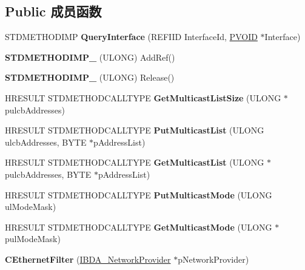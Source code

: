 \subsection*{Public 成员函数}
\begin{DoxyCompactItemize}
\item 
\mbox{\label{class_c_ethernet_filter_a9aea8339c0d38317b2fa042f58a1b2cf}} 
S\+T\+D\+M\+E\+T\+H\+O\+D\+I\+MP {\bfseries Query\+Interface} (R\+E\+F\+I\+ID Interface\+Id, \hyperlink{interfacevoid}{P\+V\+O\+ID} $\ast$Interface)
\item 
\mbox{\label{class_c_ethernet_filter_a1627f4baf9514c0c122121f06f7621fe}} 
{\bfseries S\+T\+D\+M\+E\+T\+H\+O\+D\+I\+M\+P\+\_\+} (U\+L\+O\+NG) Add\+Ref()
\item 
\mbox{\label{class_c_ethernet_filter_a08f380543c945bc69600a9c8527d1b53}} 
{\bfseries S\+T\+D\+M\+E\+T\+H\+O\+D\+I\+M\+P\+\_\+} (U\+L\+O\+NG) Release()
\item 
\mbox{\label{class_c_ethernet_filter_aa1b93ecc129da64aefc6214addb3b584}} 
H\+R\+E\+S\+U\+LT S\+T\+D\+M\+E\+T\+H\+O\+D\+C\+A\+L\+L\+T\+Y\+PE {\bfseries Get\+Multicast\+List\+Size} (U\+L\+O\+NG $\ast$pulcb\+Addresses)
\item 
\mbox{\label{class_c_ethernet_filter_a0f27b42205e630a70ee377ed3e2b6b45}} 
H\+R\+E\+S\+U\+LT S\+T\+D\+M\+E\+T\+H\+O\+D\+C\+A\+L\+L\+T\+Y\+PE {\bfseries Put\+Multicast\+List} (U\+L\+O\+NG ulcb\+Addresses, B\+Y\+TE $\ast$p\+Address\+List)
\item 
\mbox{\label{class_c_ethernet_filter_a2f7425a4df7bcb95b654ba3560b0fa3b}} 
H\+R\+E\+S\+U\+LT S\+T\+D\+M\+E\+T\+H\+O\+D\+C\+A\+L\+L\+T\+Y\+PE {\bfseries Get\+Multicast\+List} (U\+L\+O\+NG $\ast$pulcb\+Addresses, B\+Y\+TE $\ast$p\+Address\+List)
\item 
\mbox{\label{class_c_ethernet_filter_ad40e76be88267ff711abcdb8c77b4b5d}} 
H\+R\+E\+S\+U\+LT S\+T\+D\+M\+E\+T\+H\+O\+D\+C\+A\+L\+L\+T\+Y\+PE {\bfseries Put\+Multicast\+Mode} (U\+L\+O\+NG ul\+Mode\+Mask)
\item 
\mbox{\label{class_c_ethernet_filter_ad7fd28ba9ff6ff591f32e02ed704fa32}} 
H\+R\+E\+S\+U\+LT S\+T\+D\+M\+E\+T\+H\+O\+D\+C\+A\+L\+L\+T\+Y\+PE {\bfseries Get\+Multicast\+Mode} (U\+L\+O\+NG $\ast$pul\+Mode\+Mask)
\item 
\mbox{\label{class_c_ethernet_filter_a594f7f03b442ff77e22a43e7b8ce5f6b}} 
{\bfseries C\+Ethernet\+Filter} (\hyperlink{interface_i_b_d_a___network_provider}{I\+B\+D\+A\+\_\+\+Network\+Provider} $\ast$p\+Network\+Provider)
\end{DoxyCompactItemize}
